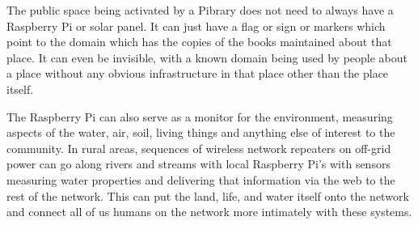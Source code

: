 The public space being activated by a Pibrary does not need to always
have a Raspberry Pi or solar panel. It can just have a flag or sign or
markers which point to the domain which has the copies of the books
maintained about that place. It can even be invisible, with a known
domain being used by people about a place without any obvious
infrastructure in that place other than the place itself.

The Raspberry Pi can also serve as a monitor for the environment,
measuring aspects of the water, air, soil, living things and anything
else of interest to the community. In rural areas, sequences of wireless
network repeaters on off-grid power can go along rivers and streams with
local Raspberry Pi's with sensors measuring water properties and
delivering that information via the web to the rest of the network. This
can put the land, life, and water itself onto the network and connect
all of us humans on the network more intimately with these systems.
